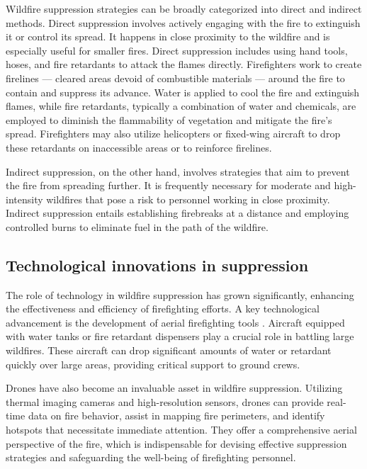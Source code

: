 \documentclass[
  12 pt,
]{Nemilov}
\begin{document}
Wildfire suppression strategies can be broadly categorized into direct and indirect methods. Direct suppression involves actively engaging with the fire to extinguish it or control its spread. It happens in close proximity to the wildfire and is especially useful for smaller fires. Direct suppression includes using hand tools, hoses, and fire retardants to attack the flames directly. Firefighters work to create firelines --- cleared areas devoid of combustible materials --- around the fire to contain and suppress its advance. Water is applied to cool the fire and extinguish flames, while fire retardants, typically a combination of water and chemicals, are employed to diminish the flammability of vegetation and mitigate the fire's spread. Firefighters may also utilize helicopters or fixed-wing aircraft to drop these retardants on inaccessible areas or to reinforce firelines.

Indirect suppression, on the other hand, involves strategies that aim to prevent the fire from spreading further. It is frequently necessary for moderate and high-intensity wildfires that pose a risk to personnel working in close proximity. Indirect suppression entails establishing firebreaks at a distance and employing controlled burns to eliminate fuel in the path of the wildfire.

\subsection{Technological innovations in suppression}\label{technological-innovations-in-suppression}

The role of technology in wildfire suppression has grown significantly, enhancing the effectiveness and efficiency of firefighting efforts. A key technological advancement is the development of aerial firefighting tools \citep{xanthopoulos2020firefighting}. Aircraft equipped with water tanks or fire retardant dispensers play a crucial role in battling large wildfires. These aircraft can drop significant amounts of water or retardant quickly over large areas, providing critical support to ground crews.

Drones have also become an invaluable asset in wildfire suppression. Utilizing thermal imaging cameras and high-resolution sensors, drones can provide real-time data on fire behavior, assist in mapping fire perimeters, and identify hotspots that necessitate immediate attention. They offer a comprehensive aerial perspective of the fire, which is indispensable for devising effective suppression strategies and safeguarding the well-being of firefighting personnel.
\end{document}
